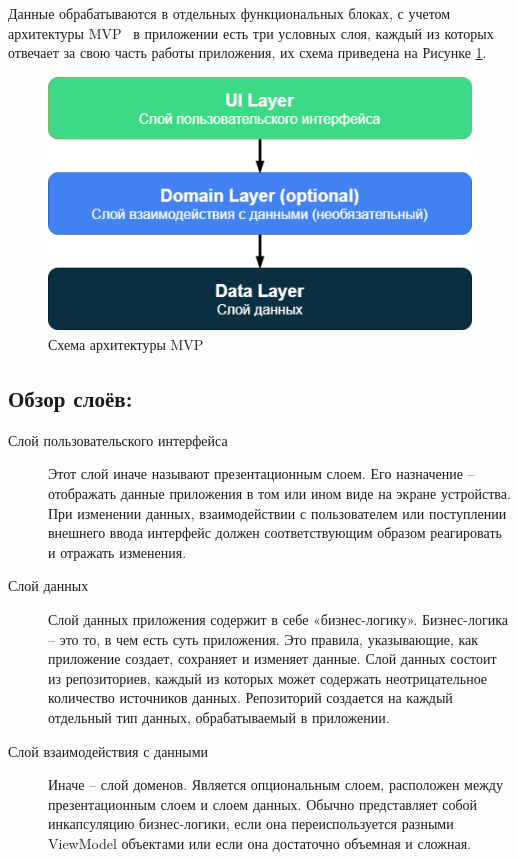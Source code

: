 Данные обрабатываются в отдельных функциональных блоках, с учетом архитектуры MVP~\autocite{mvp} \textemdash\space в приложении есть три условных слоя, каждый из которых отвечает за свою часть работы приложения, их схема приведена на Рисунке \ref{fig:arch_uil_dol_dal}.

\begin{figure}[H]
	\centering
	\includegraphics[width=\textwidth]{flesh/arch/uil-dol-dal.png}
	\caption{\label{fig:arch_uil_dol_dal}Схема архитектуры MVP}
\end{figure}

\subsection*{Обзор слоёв:}
\begin{description}
	\item[Слой пользовательского интерфейса] Этот слой иначе называют презентационным слоем. Его назначение – отображать данные приложения в том или ином виде на экране устройства. При изменении данных, взаимодействии с пользователем или поступлении внешнего ввода интерфейс должен соответствующим образом реагировать и отражать изменения.
	\item[Слой данных] Слой данных приложения содержит в себе «бизнес-логику». Бизнес-логика – это то, в чем есть суть приложения. Это правила, указывающие, как приложение создает, сохраняет и изменяет данные.
	Слой данных состоит из репозиториев, каждый из которых может содержать неотрицательное количество источников данных. Репозиторий создается на каждый отдельный тип данных, обрабатываемый в приложении.
	\item[Слой взаимодействия с данными] Иначе – слой доменов. Является опциональным слоем, расположен между презентационным слоем и слоем данных.
	Обычно представляет собой инкапсуляцию бизнес-логики, если она переиспользуется разными ViewModel объектами или если она достаточно объемная и сложная.
\end{description}

